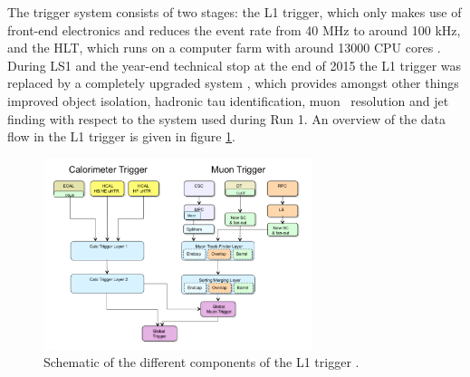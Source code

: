 The trigger system consists of two stages: the \ac{L1} trigger, which only makes use of
front-end electronics 
and reduces the event rate from 40 MHz to around 100 kHz, and the
\ac{HLT}, which runs on a computer farm with around 13000 CPU cores \cite{cms-trigger}.
During \ac{LS1} and the year-end technical stop at the end of 2015 the \ac{L1} trigger was
replaced by a completely upgraded system \cite{cms-trigger-tdr}, which provides amongst other 
things improved object isolation, hadronic tau identification, muon \pT~resolution and
jet finding with respect to the system used during Run 1.
An overview of the data flow in the \ac{L1} trigger is given in figure \ref{fig:CMS_Trigger}.

\begin{figure}[h!]
\begin{center}
\includegraphics[width=0.7\textwidth]{./Detector/Plots/CMSTrigger.png}
\caption[Schematic of the different components of the L1 trigger.]{Schematic of the different components of the \ac{L1} trigger \cite{cms-trigger-tdr}.}
\label{fig:CMS_Trigger}
\end{center}
\end{figure}



